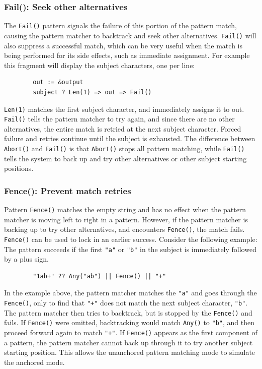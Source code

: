 \documentclass[letterpaper,12pt]{article}
\begin{document}
\subsubsection{Fail(): Seek other alternatives}

The {\tt Fail()} pattern signals the failure of this portion of the pattern
match, causing the pattern matcher to backtrack and seek other
alternatives. {\tt Fail()} will also suppress a successful match, which can
be very useful when the match is being performed for its side effects,
such as immediate assignment. For example this fragment will display
the subject characters, one per line:

\begin{verbatim}
        out := &output
        subject ? Len(1) => out => Fail()
\end{verbatim}

{\tt Len(1)} matches the first subject character, and immediately assigns
it to out. {\tt Fail()} tells the pattern matcher to try again, and since
there are no other alternatives, the entire match is retried at the
next subject character. Forced failure and retries continue until the
subject is exhausted. The difference between {\tt Abort()} and {\tt Fail()}
is that {\tt Abort()} stops all pattern matching, while {\tt Fail()} tells
the system to back up and try other alternatives or other subject starting
positions.

\subsubsection{Fence(): Prevent match retries}

Pattern {\tt Fence()} matches the empty string and has no effect when the
pattern matcher is moving left to right in a pattern. However, if the
pattern matcher is backing up to try other alternatives, and
encounters {\tt Fence()}, the match fails. {\tt Fence()} can be used to
lock in an earlier success. Consider the following example: The pattern
succeeds if the first {\tt "a"} or {\tt "b"} in the subject is immediately
followed by a plus sign.

\begin{verbatim}
        "1ab+" ?? Any("ab") || Fence() || "+"
\end{verbatim}

In the example above, the pattern matcher matches the {\tt "a"} and
goes through the {\tt Fence()}, only to find that {\tt "+"} does not match the
next subject character, {\tt "b"}. The pattern matcher then tries to
backtrack, but is stopped by the {\tt Fence()} and fails.  If {\tt Fence()}
were omitted, backtracking would match {\tt Any()} to {\tt "b"}, and
then proceed
forward again to match {\tt "+"}.  If {\tt Fence()} appears as the first
component of a pattern, the pattern matcher cannot back up through it
to try another subject starting position. This allows the unanchored
pattern matching mode to simulate the anchored mode.
\end{document}
